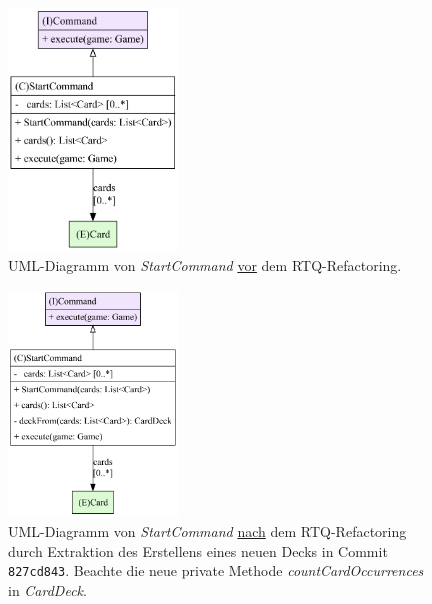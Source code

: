 \begin{figure}[H]
	\centering
	\includegraphics[width=0.4\textwidth]{Bilder/StartCommand_before_structure.pdf} 
	\caption{UML-Diagramm von \textit{StartCommand} \underline{vor} dem RTQ-Refactoring.}
	\label{fig:rtq-before}
\end{figure} 



\begin{figure}[H]
	\centering
	\includegraphics[width=0.4\textwidth]{Bilder/StartCommand_after_structure.pdf} 
	\caption{UML-Diagramm von \textit{StartCommand} \underline{nach} dem RTQ-Refactoring 
	durch Extraktion des Erstellens eines neuen Decks in Commit \texttt{827cd843}. 
	Beachte die neue private Methode \textit{countCardOccurrences} in \textit{CardDeck}.}
	\label{fig:rtq-after}
\end{figure} 